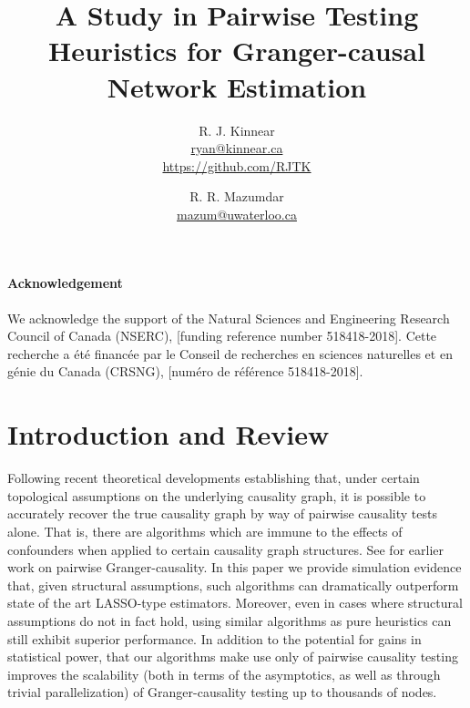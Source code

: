 \documentclass[12pt]{article}
\title{A Study in Pairwise Testing Heuristics for Granger-causal Network Estimation}
\author{R. J. Kinnear \\
  \small\href{mailto:ryan@kinnear.ca}{ryan@kinnear.ca} \\
  \small\url{https://github.com/RJTK} \and R. R. Mazumdar \\
  \small\href{mailto:mazum@uwaterloo.ca}{mazum@uwaterloo.ca}}
\begin{document}
\maketitle
{}


\paragraph{Acknowledgement}
We acknowledge the support of the Natural Sciences and Engineering Research Council of Canada (NSERC), [funding reference number 518418-2018].  Cette recherche a été financée par le Conseil de recherches en sciences naturelles et en génie du Canada (CRSNG), [numéro de référence 518418-2018].

\clearpage


\section{Introduction and Review}
\label{sec:introduction}
Following recent theoretical developments \cite{my_GC_paper}
establishing that, under certain topological assumptions on the
underlying causality graph, it is possible to accurately recover the
true causality graph by way of pairwise causality tests alone.  That
is, there are algorithms which are immune to the effects of
confounders when applied to certain causality graph structures.  See
\cite{tam2013gene_pwgc} for earlier work on pairwise Granger-causality.
In this paper we provide simulation evidence that, given structural
assumptions, such algorithms can dramatically outperform state of the
art LASSO-type estimators.  Moreover, even in cases where structural
assumptions do not in fact hold, using similar algorithms as pure
heuristics can still exhibit superior performance.  In addition to the
potential for gains in statistical power, that our algorithms make use
only of pairwise causality testing improves the scalability (both in
terms of the asymptotics, as well as through trivial parallelization)
of Granger-causality testing up to thousands of nodes.
\end{document}
